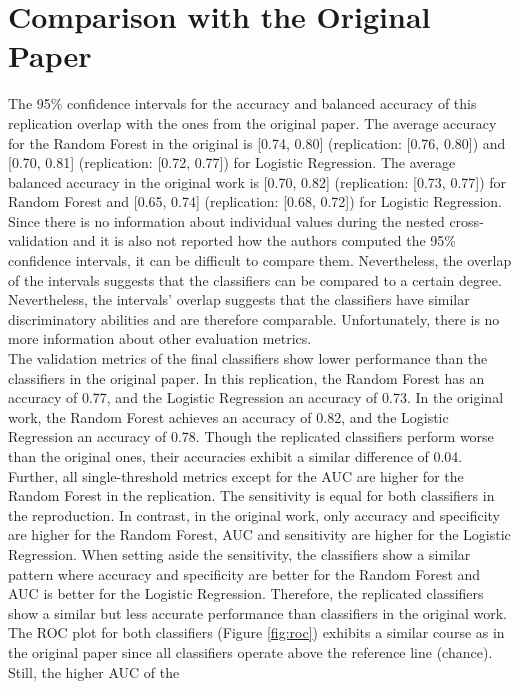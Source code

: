 \section{Comparison with the Original Paper}
The 95\% confidence intervals for the accuracy and balanced accuracy of this 
replication overlap with the ones from the original paper. The average accuracy 
for the Random Forest in the original is [0.74, 0.80] (replication: [0.76, 
0.80]) 
and [0.70, 0.81] (replication: [0.72, 0.77]) for Logistic Regression. The 
average balanced accuracy in the original work is [0.70, 0.82] (replication: 
[0.73, 0.77]) for Random Forest and [0.65, 0.74] (replication: [0.68, 0.72]) 
for Logistic Regression. Since there is no information about individual values 
during the nested cross-validation and it is also not reported how the authors 
computed the 95\% confidence intervals, it can be difficult to compare them. 
Nevertheless, the overlap of the intervals suggests that the classifiers can be 
compared to a certain degree. Nevertheless, the intervals' overlap suggests that 
the classifiers have similar discriminatory abilities and are therefore 
comparable. Unfortunately, there is no more information about other evaluation 
metrics.
\\
The validation metrics of the final classifiers show lower performance than the 
classifiers in the original paper. In this replication, the Random Forest has an 
accuracy of 0.77, and the Logistic Regression an accuracy of 0.73. In the 
original work, the Random Forest achieves an accuracy of 0.82, and the Logistic 
Regression an accuracy of 0.78. Though the replicated classifiers perform worse 
than the original ones, their accuracies exhibit a similar difference of 0.04. 
Further, all single-threshold metrics except for the AUC are higher for the 
Random Forest in the replication. The sensitivity is equal for both classifiers 
in the reproduction.  In contrast, in the original work, only accuracy and 
specificity are higher for the Random Forest, AUC and sensitivity are higher for 
the Logistic Regression. When setting aside the sensitivity, the classifiers 
show a similar pattern where accuracy and specificity are better for the Random 
Forest and AUC is better for the Logistic Regression. Therefore, the replicated 
classifiers show a similar but less accurate performance than classifiers in the 
original work. The ROC plot for both classifiers (Figure \ref{fig:roc}) 
exhibits a similar course as in the original paper since all classifiers 
operate above the reference line (chance). Still, the higher AUC of the 
